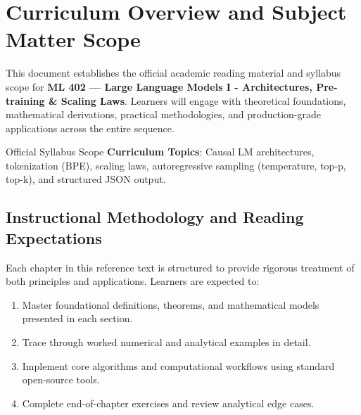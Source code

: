 \section{Curriculum Overview and Subject Matter Scope}

This document establishes the official academic reading material and syllabus scope for \textbf{ML 402 --- Large Language Models I - Architectures, Pre-training \& Scaling Laws}. Learners will engage with theoretical foundations, mathematical derivations, practical methodologies, and production-grade applications across the entire sequence.

\begin{InsightBox}{Official Syllabus Scope}
  \textbf{Curriculum Topics}: Causal LM architectures, tokenization (BPE), scaling laws, autoregressive sampling (temperature, top-p, top-k), and structured JSON output.
\end{InsightBox}

\subsection{Instructional Methodology and Reading Expectations}

Each chapter in this reference text is structured to provide rigorous treatment of both principles and applications. Learners are expected to:
\begin{enumerate}
  \item Master foundational definitions, theorems, and mathematical models presented in each section.
  \item Trace through worked numerical and analytical examples in detail.
  \item Implement core algorithms and computational workflows using standard open-source tools.
  \item Complete end-of-chapter exercises and review analytical edge cases.
\end{enumerate}

